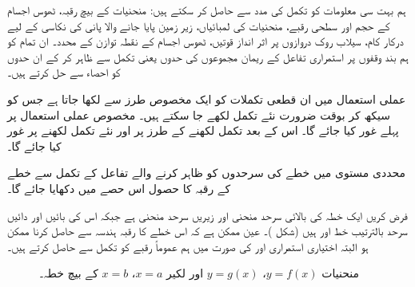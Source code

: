 

\quad
ہم بہت سی معلومات کو تکمل کی مدد سے حاصل کر سکتے ہیں: منحنیات کے بیچ رقبہ، ٹھوس اجسام کے حجم اور سطحی رقبے، منحنیات کی لمبائیاں، زیر زمین  پایا جانے والا    پانی کی نکاسی کے لیے درکار کام، سیلاب روک   دروازوں پر اثر انداز قوتیں، ٹھوس اجسام کے نقطہ توازن کے محدد۔ ان تمام کو ہم بند وقفوں پر استمراری تفاعل کے ریمان مجموعوں کی  حدوں یعنی تکمل سے ظاہر کر کے ان حدوں  کو  احصاء سے حل کرتے ہیں۔

عملی استعمال میں ان قطعی تکملات کو ایک مخصوص طرز سے لکھا جاتا ہے جس کو سیکھ کر بوقت ضرورت  نئے تکمل لکھے جا سکتے ہیں۔ مخصوص عملی استعمال پر پہلے غور کیا جائے گا۔ اس کے بعد تکمل لکھنے کے طرز  پر  اور نئے تکمل لکھنے پر غور کیا جائے گا۔

محددی مستوی میں خطے کی سرحدوں کو ظاہر کرنے والے تفاعل کے تکمل سے خطے  کے رقبہ کا حصول اس حصے میں دکھایا جائے گا۔

فرض کریں ایک خطہ کی بالائی سرحد  منحنی  اور زیریں سرحد منحنی  ہے  جبکہ اس کی  بائیں  اور دائیں سرحد بالترتیب خط  اور  ہیں (شکل )۔ عین ممکن ہے کہ اس خطے کا رقبہ ہندسہ سے حاصل کرنا ممکن ہو البتہ اختیاری استمراری  اور  کی صورت میں ہم عموماً رقبے کو تکمل سے حاصل کرتے ہیں۔ 
\begin{figure}
\centering
{}
\caption{
منحنیات $y=f(x)$، $y=g(x)$ اور لکیر $x=a$، $x=b$ کے بیچ خطہ۔
}
\label{شکل_استعمال_تکمل_منحنیات_بیچ}
\end{figure}

